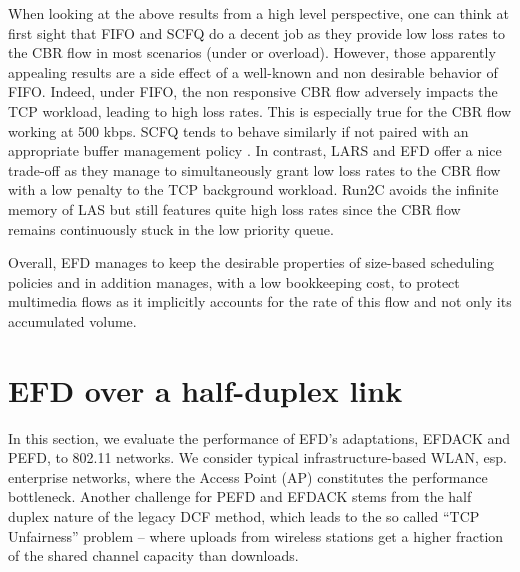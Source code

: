\documentclass[preprint,12pt]{elsarticle}
\begin{document}
When looking at the above results from a high level perspective, one can think at first sight that FIFO and SCFQ do a decent job as they provide low loss rates to the CBR flow in most scenarios (under or overload). However, those apparently appealing results are a side effect of a well-known and non desirable behavior of FIFO. Indeed, under FIFO, the non responsive CBR flow adversely impacts the TCP workload, leading to high loss rates. This is especially true for the CBR flow working at 500 kbps. SCFQ tends to behave similarly if  not paired with an appropriate buffer management policy \cite{Golestani94SCFQ}. In contrast, LARS and EFD offer a nice trade-off as they manage to simultaneously grant  low loss rates to the CBR flow with a low penalty to the TCP background workload. Run2C avoids the  infinite memory of LAS but still features quite high loss rates since the CBR flow remains continuously stuck in the low priority queue.


Overall, EFD manages to keep the desirable properties of size-based scheduling policies and in addition manages, with a low bookkeeping cost, to protect multimedia flows as it  implicitly accounts for the rate of this flow and not only its accumulated volume. 


\section{EFD over a half-duplex link}
\label{sec:perf_wlan}
In this section, we evaluate the performance of EFD's adaptations, EFDACK and PEFD,  to  802.11  networks. %
We consider  typical infrastructure-based WLAN, esp. enterprise networks, where the Access Point (AP) constitutes the performance bottleneck. Another challenge for PEFD and EFDACK stems from the half duplex nature of  the legacy DCF method, which %
leads to the so called ``TCP Unfairness'' \cite{Pilosof03understandingtcp} problem -- where uploads from wireless stations get a higher fraction of the shared channel capacity than downloads. 
\end{document}
